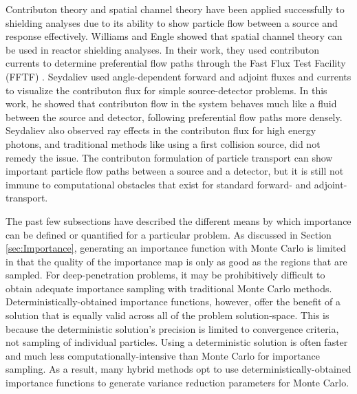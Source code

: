 Contributon theory and spatial channel theory have been applied successfully to
shielding analyses \cite{seydaliev_contributon_2008, williams_SCC_shielding} due
to its ability to show particle flow between a source and response effectively.
Williams and Engle showed that
spatial channel theory can be used in reactor shielding analyses.
In their work, they used
contributon currents to determine preferential flow paths through the Fast Flux
Test Facility (FFTF) \cite{williams_SCC_shielding}.
Seydaliev \cite{seydaliev_contributon_2008} used angle-dependent forward and
adjoint
fluxes and currents to visualize the contributon flux for
simple source-detector problems. In this work, he showed that contributon flow
in the system behaves much like a fluid between the source and detector,
following preferential flow paths more densely.
Seydaliev also observed ray effects in the
contributon flux for high energy photons, and traditional methods like using a
first collision source, did not remedy the issue. The contributon formulation of
particle transport can show important particle flow paths between a source and a
detector, but it is still not immune to computational obstacles that exist for
standard forward- and adjoint- transport.

The past few subsections have described the different means by which importance
can be defined or quantified for a particular problem.
As discussed in Section \ref{sec:Importance}, generating an importance function
with Monte Carlo is limited in that the quality of the importance map is only as
good as the regions that are sampled. For deep-penetration problems, it may be
prohibitively difficult to obtain adequate importance sampling with traditional
Monte Carlo methods. Deterministically-obtained importance functions, however,
offer the benefit of a solution that is equally valid across all of the problem
solution-space. This is because the deterministic solution's precision is
limited to convergence criteria, not sampling of individual particles. Using a
deterministic solution is often faster and much less computationally-intensive
than Monte Carlo for importance sampling. As a result, many hybrid methods opt
to use deterministically-obtained importance functions to generate variance
reduction parameters for Monte Carlo.

